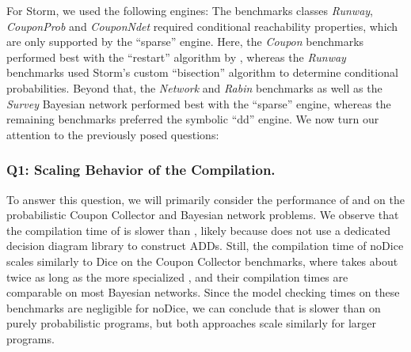 For Storm, we used the following engines: The benchmarks classes \textit{Runway}, \textit{CouponProb} and \textit{CouponNdet} required conditional reachability properties, which are only supported by the \enquote{sparse} engine.	
Here, the \textit{Coupon} benchmarks performed best with the \enquote{restart} algorithm by \citet{baier2014computing}, whereas the \textit{Runway} benchmarks used Storm's custom \enquote{bisection} algorithm to determine conditional probabilities. 
Beyond that, the \textit{Network} and \textit{Rabin} benchmarks as well as the \textit{Survey} Bayesian network performed best with the \enquote{sparse} engine, whereas the remaining benchmarks preferred the symbolic \enquote{dd} engine.
We now turn our attention to the previously posed questions:



\subsubsection*{Q1: Scaling Behavior of the Compilation.}
To answer this question, we will primarily consider the performance of \DICE and \NDICE on the probabilistic Coupon Collector and Bayesian network problems. 
We observe that the compilation time of \NDICE is slower than \DICE, likely because \NDICE does not use a dedicated decision diagram library to construct ADDs.
Still, the compilation time of noDice scales similarly to Dice on the Coupon Collector benchmarks, where \NDICE takes about twice as long as the more specialized \DICE, and their compilation times are comparable on most Bayesian networks.
Since the model checking times on these benchmarks are negligible for noDice, we can conclude that  \NDICE is slower than \DICE on purely probabilistic programs, but both approaches scale similarly for larger programs.



